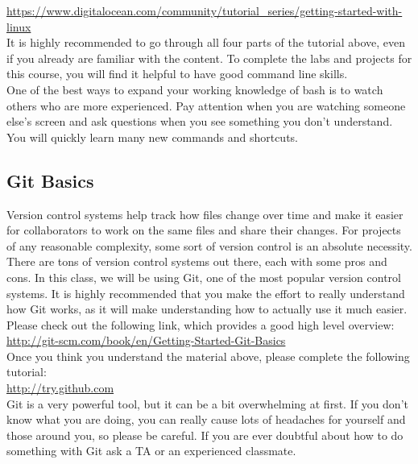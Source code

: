 \documentclass[11pt]{article}
\begin{document}
\url{https://www.digitalocean.com/community/tutorial_series/getting-started-with-linux}\\

It is highly recommended to go through all four parts of the tutorial above, even if you already are familiar with the content. To complete the labs and projects for this course, you will find it helpful to have good command line skills. \\

One of the best ways to expand your working knowledge of bash is to watch others who are more experienced. Pay attention when you are watching someone else's screen and ask questions when you see something you don't understand. You will quickly learn many new commands and shortcuts.

\subsection{Git Basics}
Version control systems help track how files change over time and make it easier for collaborators to work on the same files and share their changes. For projects of any reasonable complexity, some sort of version control is an absolute necessity. There are tons of version control systems out there, each with some pros and cons. In this class, we will be using Git, one of the most popular version control systems. It is highly recommended that you make the effort to really understand how Git works, as it will make understanding how to actually use it much easier. Please check out the following link, which provides a good high level overview: \\

\url{http://git-scm.com/book/en/Getting-Started-Git-Basics}\\

Once you think you understand the material above, please complete the following tutorial:\\

\url{http://try.github.com}\\

Git is a very powerful tool, but it can be a bit overwhelming at first. If you don't know what you are doing, you can really cause lots of headaches for yourself and those around you, so please be careful. If you are ever doubtful about how to do something with Git ask a TA or an experienced classmate.\\
\end{document}
